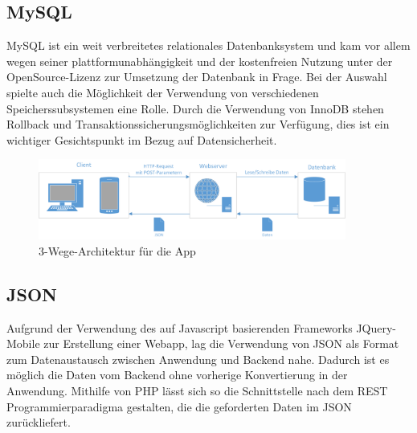 \documentclass[10pt, conference, compsocconf]{IEEEtran}
\begin{document}
\subsection{MySQL}
MySQL ist ein weit verbreitetes relationales Datenbanksystem und kam vor allem wegen seiner plattformunabh\"angigkeit und der kostenfreien Nutzung unter der OpenSource-Lizenz zur Umsetzung der Datenbank in Frage. 
Bei der Auswahl spielte auch die M\"oglichkeit der Verwendung von verschiedenen Speicherssubsystemen eine Rolle. 
Durch die Verwendung von InnoDB stehen Rollback und Transaktionssicherungsm\"oglichkeiten zur Verf\"ugung, dies ist ein wichtiger Gesichtspunkt im Bezug auf Datensicherheit.

\begin{figure}[t]
	\centering
	\includegraphics[width=0.9\textwidth]{./Bilder_Zeichnungen/Architektur.png}
	\caption{3-Wege-Architektur f\"ur die App}
	\label{fig:Architektur}
\end{figure}

\subsection{JSON}
Aufgrund der Verwendung des auf Javascript basierenden Frameworks JQuery-Mobile zur Erstellung einer Webapp, lag die Verwendung von JSON als Format zum Datenaustausch zwischen Anwendung und Backend nahe. 
Dadurch ist es m\"oglich die Daten vom Backend ohne vorherige Konvertierung in der Anwendung. 
Mithilfe von PHP l\"asst sich so die Schnittstelle nach dem REST Programmierparadigma gestalten, die die geforderten Daten im JSON zur\"uckliefert. 
\end{document}
